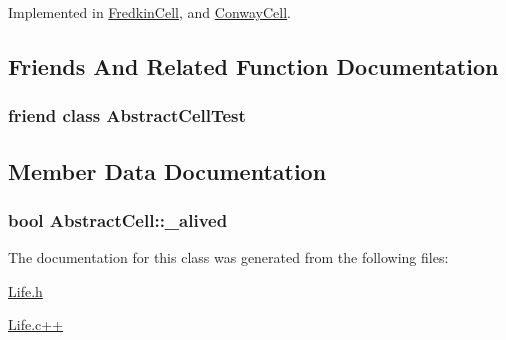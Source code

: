 Implemented in \hyperlink{classFredkinCell_a55fa842b999a1293d08be7d3a75cb537}{Fredkin\-Cell}, and \hyperlink{classConwayCell_a6a0d34c7f90a1b76e144c891ba4541e5}{Conway\-Cell}.



\subsection{Friends And Related Function Documentation}
\hypertarget{classAbstractCell_a8a83d646164e396527131ba80ec82bdc}{
\subsubsection[{Abstract\-Cell\-Test}]{\setlength{\rightskip}{0pt plus 5cm}friend class Abstract\-Cell\-Test\hspace{0.3cm}{\ttfamily [friend]}}}\label{classAbstractCell_a8a83d646164e396527131ba80ec82bdc}


\subsection{Member Data Documentation}
\hypertarget{classAbstractCell_abdd4785483cace729e7fee7a1e53848c}{
\subsubsection[{\-\_\-alived}]{\setlength{\rightskip}{0pt plus 5cm}bool Abstract\-Cell\-::\-\_\-alived\hspace{0.3cm}{\ttfamily [protected]}}}\label{classAbstractCell_abdd4785483cace729e7fee7a1e53848c}


The documentation for this class was generated from the following files\-:\begin{DoxyCompactItemize}
\item 
\hyperlink{Life_8h}{Life.\-h}\item 
\hyperlink{Life_8c_09_09}{Life.\-c++}\end{DoxyCompactItemize}
